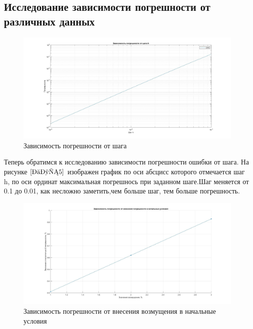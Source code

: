 \documentclass[a4paper]{article}
\begin{document}
\subsection{Исследование зависимости погрешности от различных данных} 

\begin{figure}[h!]
\begin{center}
\includegraphics[scale=0.3]{зависимость погрешности от шага н.jpg} 
\end{center}
\caption{Зависимость погрешности от шага} \label{Рис5}
\end{figure}
Теперь обратимся к исследованию зависимости погрешности ошибки от шага. На рисунке $\ref{Рис5}$ изображен график по оси абсцисс которого отмечается шаг h, по оси ординат максимальная погрешнось при заданном шаге.Шаг меняется от 0.1 до 0.01, как несложно заметить,чем больше шаг, тем больше погрешность.


\begin{figure}[h!]
\begin{center}
\includegraphics[scale=0.3]{зависимость погрешности от внесения возмущения в начальные условия.jpg}  
\end{center}
\caption{Зависимость погрешности от внесения возмущения в начальные условия} \label{Рис6}
\end{figure}
\end{document}
